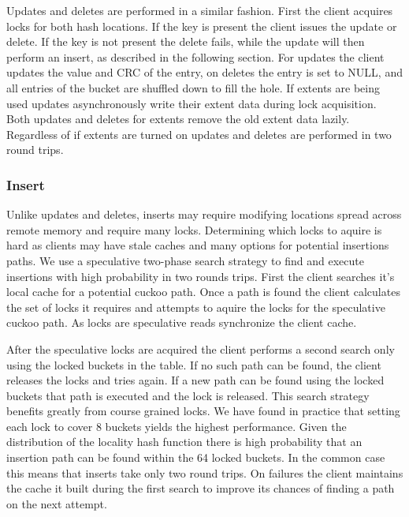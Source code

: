 Updates and deletes are performed in a similar fashion.
First the client acquires locks for both hash locations. If
the key is present the client issues the update or delete.
If the key is not present the delete fails, while the update
will then perform an insert, as described in the following
section. For updates the client updates the value and CRC of
the entry, on deletes the entry is set to NULL, and all
entries of the bucket are shuffled down to fill the hole.
If extents are being used updates asynchronously write their
extent data during lock acquisition. Both updates and
deletes for extents remove the old extent data lazily.
Regardless of if extents are turned on updates and deletes
are performed in two round trips.

\subsubsection{Insert}

Unlike updates and deletes, inserts may require modifying
locations spread across remote memory and require many
locks. Determining which locks to aquire is hard as clients
may have stale caches and many options for potential
insertions paths.  We use a speculative two-phase search
strategy to find and execute insertions with high
probability in two rounds trips. First the client searches
it's local cache for a potential cuckoo path. Once a path is
found the client calculates the set of locks it requires and
attempts to aquire the locks for the speculative cuckoo
path. As locks are speculative reads synchronize the client
cache.

After the speculative locks are acquired the client performs
a second search only using the locked buckets in the table.
If no such path can be found, the client releases the locks
and tries again. If a new path can be found using the locked
buckets that path is executed and the lock is released.
This search strategy benefits greatly from course grained
locks. We have found in practice that setting each lock to
cover 8 buckets yields the highest performance. Given the
distribution of the locality hash function there is high
probability that an insertion path can be found within the
64 locked buckets. In the common case this means that
inserts take only two round trips. On failures the client
maintains the cache it built during the first search to
improve its chances of finding a path on the next attempt.



